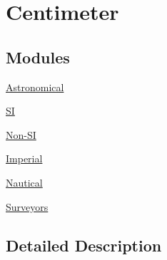 \hypertarget{group___e_g_x_math-_conversions-_length_conversions-_s_i-_centimeter}{}\section{Centimeter}
\label{group___e_g_x_math-_conversions-_length_conversions-_s_i-_centimeter}
\subsection*{Modules}
\begin{DoxyCompactItemize}
\item 
\mbox{\hyperlink{group___e_g_x_math-_conversions-_length_conversions-_s_i-_centimeter-_astronomical}{Astronomical}}
\item 
\mbox{\hyperlink{group___e_g_x_math-_conversions-_length_conversions-_s_i-_centimeter-_s_i}{SI}}
\item 
\mbox{\hyperlink{group___e_g_x_math-_conversions-_length_conversions-_s_i-_centimeter-_non-_s_i}{Non-\/\+SI}}
\item 
\mbox{\hyperlink{group___e_g_x_math-_conversions-_length_conversions-_s_i-_centimeter-_imperial}{Imperial}}
\item 
\mbox{\hyperlink{group___e_g_x_math-_conversions-_length_conversions-_s_i-_centimeter-_nautical}{Nautical}}
\item 
\mbox{\hyperlink{group___e_g_x_math-_conversions-_length_conversions-_s_i-_centimeter-_surveyors}{Surveyors}}
\end{DoxyCompactItemize}


\subsection{Detailed Description}

